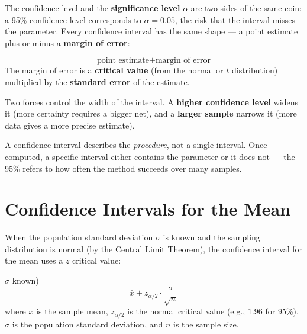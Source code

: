 \documentclass[
  11pt,
  letterpaper,
  DIV=11,
  numbers=noendperiod,
  oneside,
  open=any]{scrreprt}
\begin{document}
The confidence level and the \textbf{significance level} \(\alpha\) are
two sides of the same coin: a 95\% confidence level corresponds to
\(\alpha = 0.05\), the risk that the interval misses the parameter.
Every confidence interval has the same shape --- a point estimate plus
or minus a \textbf{margin of error}:

\begin{bsformula}

\[\text{point estimate} \pm \text{margin of error}\] The margin of error
is a \textbf{critical value} (from the normal or \(t\) distribution)
multiplied by the \textbf{standard error} of the estimate.

\end{bsformula}

Two forces control the width of the interval. A \textbf{higher
confidence level} widens it (more certainty requires a bigger net), and
a \textbf{larger sample} narrows it (more data gives a more precise
estimate).

\begin{tcolorbox}[enhanced jigsaw, breakable, left=2mm, title=\textcolor{quarto-callout-note-color}{\faInfo}\hspace{0.5em}{Note}, coltitle=black, colframe=quarto-callout-note-color-frame, rightrule=.15mm, toprule=.15mm, arc=.35mm, opacityback=0, titlerule=0mm, bottomtitle=1mm, toptitle=1mm, colback=white, colbacktitle=quarto-callout-note-color!10!white, opacitybacktitle=0.6, leftrule=.75mm, bottomrule=.15mm]

A confidence interval describes the \emph{procedure}, not a single
interval. Once computed, a specific interval either contains the
parameter or it does not --- the 95\% refers to how often the method
succeeds over many samples.

\end{tcolorbox}

\section{Confidence Intervals for the
Mean}\label{confidence-intervals-for-the-mean}

When the population standard deviation \(\sigma\) is known and the
sampling distribution is normal (by the Central Limit Theorem), the
confidence interval for the mean uses a \(z\) critical value:

\begin{bsformula}

\(\sigma\) known)
\[\bar{x} \pm z_{\alpha/2} \cdot \frac{\sigma}{\sqrt{n}}\] where
\(\bar{x}\) is the sample mean, \(z_{\alpha/2}\) is the normal critical
value (e.g., \(1.96\) for 95\%), \(\sigma\) is the population standard
deviation, and \(n\) is the sample size.

\end{bsformula}
\end{document}
